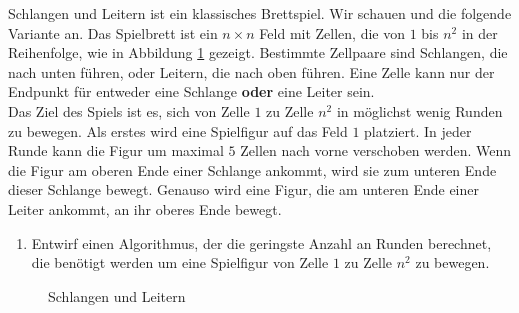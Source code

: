 \documentclass{uebung_cs}
\begin{document}
\begin{aufgabe}
	Schlangen und Leitern ist ein klassisches Brettspiel.
	Wir schauen und die folgende Variante an.
	Das Spielbrett ist ein $n \times n$ Feld mit Zellen, die von $1$ bis $n^2$ in der Reihenfolge, wie in Abbildung \ref{snakesladders} gezeigt.
	Bestimmte Zellpaare sind Schlangen, die nach unten führen, oder Leitern, die nach oben führen.
	Eine Zelle kann nur der Endpunkt für entweder eine Schlange \textbf{oder} eine Leiter sein.\\
	Das Ziel des Spiels ist es, sich von Zelle $1$ zu Zelle $n^2$ in möglichst wenig Runden zu bewegen.
	Als erstes wird eine Spielfigur auf das Feld $1$ platziert.
	In jeder Runde kann die Figur um maximal $5$ Zellen nach vorne verschoben werden.
	Wenn die Figur am oberen Ende einer Schlange ankommt, wird sie zum unteren Ende dieser Schlange bewegt.
	Genauso wird eine Figur, die am unteren Ende einer Leiter ankommt, an ihr oberes Ende bewegt.
	\begin{enumerate}
		\item Entwirf einen Algorithmus, der die geringste Anzahl an Runden berechnet, die benötigt werden um eine Spielfigur von Zelle $1$ zu Zelle $n^2$ zu bewegen.
	\end{enumerate}
	\begin{center}
		\begin{figure}
			\hspace*{\fill}	
			\hspace*{\fill}	
			\caption{Schlangen und Leitern}
			\label{snakesladders}
		\end{figure}
	\end{center}
\end{aufgabe}
\end{document}
